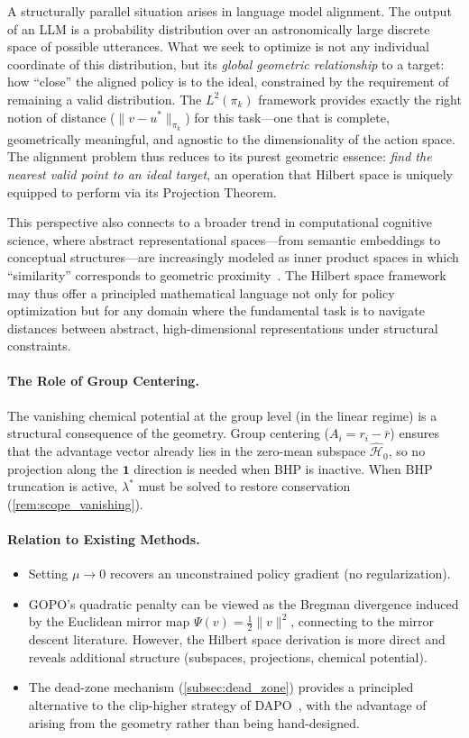 \documentclass[11pt]{article}
\theoremstyle{definition}
\theoremstyle{remark}
\newcommand{\pik}{\pi_k}
\begin{document}
A structurally parallel situation arises in language model alignment. The output of an LLM is a probability distribution over an astronomically large discrete space of possible utterances. What we seek to optimize is not any individual coordinate of this distribution, but its \emph{global geometric relationship} to a target: how ``close'' the aligned policy is to the ideal, constrained by the requirement of remaining a valid distribution. The $L^2(\pik)$ framework provides exactly the right notion of distance ($\|v - u^*\|_{\pik}$) for this task---one that is complete, geometrically meaningful, and agnostic to the dimensionality of the action space. The alignment problem thus reduces to its purest geometric essence: \emph{find the nearest valid point to an ideal target}, an operation that Hilbert space is uniquely equipped to perform via its Projection Theorem.

This perspective also connects to a broader trend in computational cognitive science, where abstract representational spaces---from semantic embeddings to conceptual structures---are increasingly modeled as inner product spaces in which ``similarity'' corresponds to geometric proximity~\cite{Gardenfors2000,Busemeyer2012}. The Hilbert space framework may thus offer a principled mathematical language not only for policy optimization but for any domain where the fundamental task is to navigate distances between abstract, high-dimensional representations under structural constraints.

\paragraph{The Role of Group Centering.}
The vanishing chemical potential at the group level (in the linear regime) is a structural consequence of the geometry. Group centering ($A_i = r_i - \bar{r}$) ensures that the advantage vector already lies in the zero-mean subspace $\hat{\mathcal{H}}_0$, so no projection along the $\mathbf{1}$ direction is needed when BHP is inactive. When BHP truncation is active, $\lambda^*$ must be solved to restore conservation (\cref{rem:scope_vanishing}).

\paragraph{Relation to Existing Methods.}
\begin{itemize}[leftmargin=2em]
    \item Setting $\mu \to 0$ recovers an unconstrained policy gradient (no regularization).
    \item GOPO's quadratic penalty can be viewed as the Bregman divergence induced by the Euclidean mirror map $\Psi(v) = \frac{1}{2}\|v\|^2$, connecting to the mirror descent literature. However, the Hilbert space derivation is more direct and reveals additional structure (subspaces, projections, chemical potential).
    \item The dead-zone mechanism (\cref{subsec:dead_zone}) provides a principled alternative to the clip-higher strategy of DAPO~\cite{Yu2025DAPO}, with the advantage of arising from the geometry rather than being hand-designed.
\end{itemize}
\end{document}

